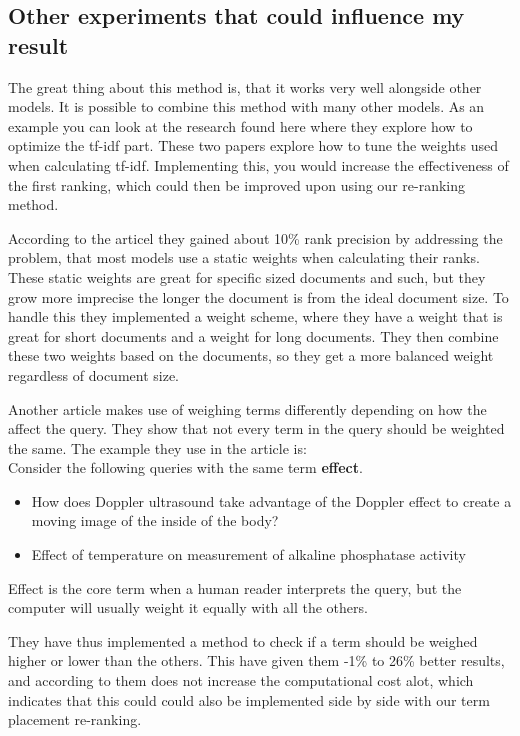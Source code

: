 \documentclass{sig-alternate}
\begin{document}
\subsection{Other experiments that could influence my result}

The great thing about this method is, that it works very well alongside other models. It is possible to combine this method with many other models. As an example you can look at the research found here\cite{review1} where they explore how to optimize the tf-idf part. These two papers explore how to tune the weights used when calculating tf-idf. Implementing this, you would increase the effectiveness of the first ranking, which could then be improved upon using our re-ranking method. 

According to the articel\cite{review1} they gained about 10\% rank precision by addressing the problem, that most models use a static weights when calculating their ranks. These static weights are great for specific sized documents and such, but they grow more imprecise the longer the document is from the ideal document size. To handle this they implemented a weight scheme, where they have a weight that is great for short documents and a weight for long documents. They then combine these two weights based on the documents, so they get a more balanced weight regardless of document size.

Another article\cite{review3} makes use of weighing terms differently depending on how the affect the query. They show that not every term in the query should be weighted the same. The example they use in the article is:\\
Consider the following queries with the same term \textbf{effect}.
\begin{itemize}
\item How does Doppler ultrasound take advantage of the
Doppler effect to create a moving image of the inside
of the body?
\item Effect of temperature on measurement of alkaline phosphatase
activity
\end{itemize}
Effect is the core term when a human reader interprets the query, but the computer will usually weight it equally with all the others. 

They have thus implemented a method to check if a term should be weighed higher or lower than the others. This have given them -1\% to 26\% better results, and according to them does not increase the computational cost alot, which indicates that this could could also be implemented side by side with our term placement re-ranking.
\end{document}
